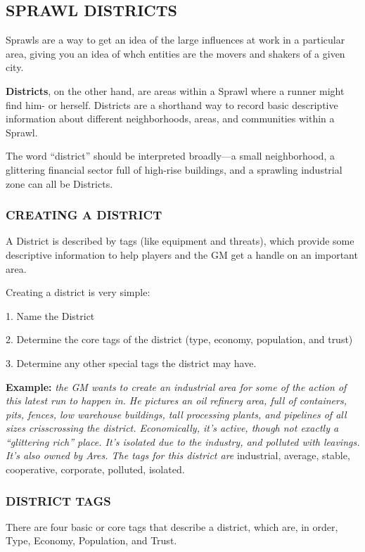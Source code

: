 \documentclass[oneside,10pt]{article}
\begin{document}
\begin{multicols}{2}
\subsection{SPRAWL DISTRICTS}
Sprawls are a way to get an idea of the large influences at
work in a particular area, giving you an idea of whch entities
are the movers and shakers of a given city.

\textbf{Districts}, on the other hand, are areas within a Sprawl where
a runner might find him- or herself. Districts are a shorthand
way to record basic descriptive information about different
neighborhoods, areas, and communities within a Sprawl.

The word ``district'' should be interpreted broadly—a small
neighborhood, a glittering financial sector full of high-rise
buildings, and a sprawling industrial zone can all be Districts.

\subsubsection{CREATING A DISTRICT}
A District is described by tags (like equipment and threats),
which provide some descriptive information to help players
and the GM get a handle on an important area.

Creating a district is very simple:
\begin{dent}

1.	Name the District

2.	Determine the core tags of the district (type, economy,
population, and trust)

3.	Determine any other special tags the district may have.

\textbf{Example:} \textit{the GM wants to create an industrial area for
some of the action of this latest run to happen in. He pictures an oil refinery area, full of containers, pits, fences, low
warehouse buildings, tall processing plants, and pipelines
of all sizes crisscrossing the district. Economically, it’s active, though not exactly a ``glittering rich'' place. It’s isolated due to the industry, and polluted with leavings. It’s
also owned by Ares. The tags for this district are} industrial,
average, stable, cooperative, corporate, polluted, isolated.
\end{dent}
\subsubsection{DISTRICT TAGS}
There are four basic or core tags that describe a district, which
are, in order, Type, Economy, Population, and Trust.


\end{multicols}
\end{document}
